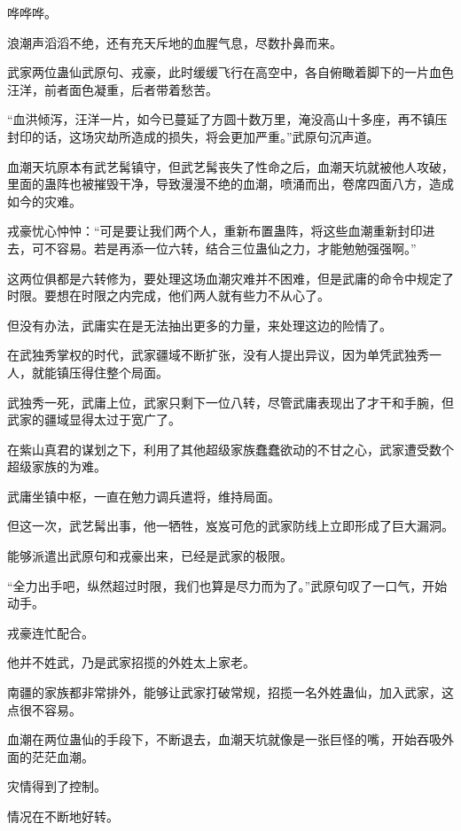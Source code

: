 
\begin{this_body}

哗哗哗。

浪潮声滔滔不绝，还有充天斥地的血腥气息，尽数扑鼻而来。

武家两位蛊仙武原句、戎豪，此时缓缓飞行在高空中，各自俯瞰着脚下的一片血色汪洋，前者面色凝重，后者带着愁苦。

“血洪倾泻，汪洋一片，如今已蔓延了方圆十数万里，淹没高山十多座，再不镇压封印的话，这场灾劫所造成的损失，将会更加严重。”武原句沉声道。

血潮天坑原本有武艺髯镇守，但武艺髯丧失了性命之后，血潮天坑就被他人攻破，里面的蛊阵也被摧毁干净，导致漫漫不绝的血潮，喷涌而出，卷席四面八方，造成如今的灾难。

戎豪忧心忡忡：“可是要让我们两个人，重新布置蛊阵，将这些血潮重新封印进去，可不容易。若是再添一位六转，结合三位蛊仙之力，才能勉勉强强啊。”

这两位俱都是六转修为，要处理这场血潮灾难并不困难，但是武庸的命令中规定了时限。要想在时限之内完成，他们两人就有些力不从心了。

但没有办法，武庸实在是无法抽出更多的力量，来处理这边的险情了。

在武独秀掌权的时代，武家疆域不断扩张，没有人提出异议，因为单凭武独秀一人，就能镇压得住整个局面。

武独秀一死，武庸上位，武家只剩下一位八转，尽管武庸表现出了才干和手腕，但武家的疆域显得太过于宽广了。

在紫山真君的谋划之下，利用了其他超级家族蠢蠢欲动的不甘之心，武家遭受数个超级家族的为难。

武庸坐镇中枢，一直在勉力调兵遣将，维持局面。

但这一次，武艺髯出事，他一牺牲，岌岌可危的武家防线上立即形成了巨大漏洞。

能够派遣出武原句和戎豪出来，已经是武家的极限。

“全力出手吧，纵然超过时限，我们也算是尽力而为了。”武原句叹了一口气，开始动手。

戎豪连忙配合。

他并不姓武，乃是武家招揽的外姓太上家老。

南疆的家族都非常排外，能够让武家打破常规，招揽一名外姓蛊仙，加入武家，这点很不容易。

血潮在两位蛊仙的手段下，不断退去，血潮天坑就像是一张巨怪的嘴，开始吞吸外面的茫茫血潮。

灾情得到了控制。

情况在不断地好转。


\end{this_body}
